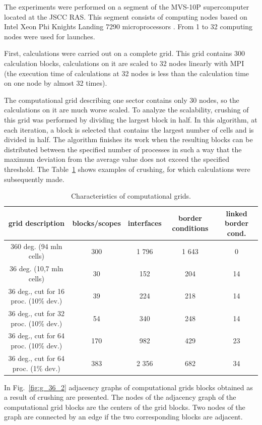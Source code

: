 \documentclass[
11pt,%
tightenlines,%
twoside,%
onecolumn,%
nofloats,%
nobibnotes,%
nofootinbib,%
superscriptaddress,%
noshowpacs,%
centertags]%
{revtex4}
\begin{document}
The experiments were performed on a segment of the MVS-10P
supercomputer  located at the JSCC RAS. This segment consists of
computing nodes based on Intel Xeon Phi Knights Landing 7290
microprocessors \cite{Jeffers_KNL}. From 1 to 32 computing nodes
were used for launches.

First, calculations were carried out on a complete grid. This grid
contains 300 calculation blocks, calculations on it are scaled  to
32 nodes linearly with MPI \cite{Queen} (the execution time of
calculations at 32 nodes is less than the calculation time on one
node by almost 32 times).

The computational grid describing one sector contains only 30 nodes,
so  the calculations on it are much worse scaled. To analyze the
scalability, crushing of this grid was performed by dividing the
largest block in half. In this algorithm, at each iteration, a block
is selected that contains the largest number of cells and is divided
in half. The algorithm finishes its work when the resulting blocks
can be distributed between the specified number of processes in such
a way that the maximum deviation from the average value does not
exceed the specified threshold. The Table~\ref{tab:grids} shows
examples of crushing, for which calculations were subsequently made.

\begin{table}[!ht]
\setcaptionmargin{0mm}
\onelinecaptionsfalse
{}
\caption{Characteristics of computational grids.}
\bigskip
\begin{tabular}{|c|c|c|c|c|}
\hline
grid description & blocks/scopes & interfaces & border conditions & linked border cond. \\
\hline
360 deg. (94 mln cells) & 300 & 1 796 & 1 643 & 0 \\
36 deg. (10,7 mln cells) & 30 & 152 & 204 & 14 \\
\hline
36 deg., cut for 16 proc. (10\% dev.) & 39 & 224 & 218 & 14 \\
36 deg., cut for 32 proc. (10\% dev.) & 54 & 340 & 248 & 14 \\
36 deg., cut for 64 proc. (10\% dev.) & 170 & 982 & 429 & 23 \\
\hline
36 deg., cut for 64 proc. (1\% dev.) & 383 & 2 356 & 682 & 34 \\
\hline
\end{tabular}
\label{tab:grids}
\end{table}

In Fig.~\ref{fig:g_36_2} adjacency graphs of computational grids
blocks obtained as a result of crushing are presented. The nodes of
the adjacency graph of the computational grid blocks are the centers
of the grid blocks. Two nodes of the graph are connected by an edge
if the two corresponding blocks are adjacent.
\end{document}
